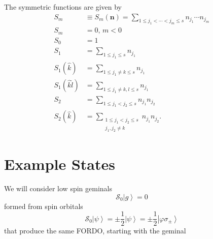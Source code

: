 \documentclass[aps,preprint]{revtex4}%
\begin{document}
The symmetric functions are given by
\begin{align*}
S_{m}  &  \equiv S_{m}\left(  \mathbf{n}\right)  =\sum_{1\leq j_{1}%
<\cdots<j_{m}\leq s}n_{j_{1}}\cdots n_{j_{m}}\\
S_{m}  &  =0,\,m<0\\
S_{0}  &  =1\\
S_{1}  &  =\sum_{1\leq j_{1}\leq s}n_{j_{1}}\\
S_{1}\left(  \hat{k}\right)   &  =\sum_{1\leq j_{1}\neq k\leq s}n_{j_{1}}\\
S_{1}\left(  \hat{k}\hat{l}\right)   &  =\sum_{1\leq j_{1}\neq k,l\leq
s}n_{j_{1}}\\
S_{2}  &  =\sum_{1\leq j_{1}<j_{2}\leq s}n_{j_{1}}n_{j_{2}}\\
S_{2}\left(  \hat{k}\right)   &  =\sum_{\substack{1\leq j_{1}<j_{2}\leq
s\\j_{1},j_{2}\neq k}}n_{j_{1}}n_{j_{2}}.
\end{align*}


\section{Example States}

We will consider low spin geminals
\[
\mathcal{S}_{0}\left\vert g\right\rangle =0
\]
formed from spin orbitals
\[
\mathcal{S}_{0}\left\vert \psi\right\rangle =\pm\frac{1}{2}\left\vert
\psi\right\rangle =\pm\frac{1}{2}\left\vert \varphi\sigma_{\pm}\right\rangle
\]
that produce the same FORDO, starting with the geminal%
\end{document}
